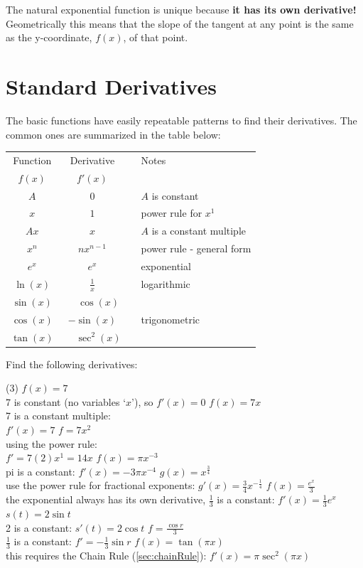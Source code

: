 The natural exponential function is unique because \textbf{it has its own derivative!} Geometrically this means that the slope of the tangent at any point is the same as the y-coordinate, $f(x)$, of that point. 

\section{Standard Derivatives}
The basic functions have easily repeatable patterns to find their derivatives. The common ones are summarized in the table below:
\begin{center}
	\begin{tabular}{ccll}	
		\toprule
		Function& Derivative&&Notes\\
		$f(x)$ & $f'(x)$  &&\\ \midrule
		$A$&0&&$A$ is constant\\ \midrule
		$x$&$1$&&power rule for $x^1$\\ \midrule
		$Ax$&$x$&&$A$ is a constant multiple\\ \midrule
		$x^n$ & $nx^{n-1}$ &&power rule - general form\\ \midrule
		$e^x$ & $e^x$  && exponential\\ \midrule
		$\ln(x)$ & $\frac{1}{x}$ &&logarithmic\\ \midrule
		$\sin(x)$ & $\phantom{-}\cos(x)$  && \\ \cmidrule{1-2}
		$\cos(x)$ & $-\sin(x)$ && trigonometric\\ \cmidrule{1-2}
		$\tan(x)$ & $\phantom{-}\sec^2(x)$ && \\ \bottomrule
	\end{tabular}
\end{center}\clearpage
\example Find the following derivatives:
\begin{tasks}[column-sep=2em,after-item-skip=3ex](3)
	\task $f(x)=7$\\ 7 is constant (no variables `$x$'), so $f'(x)=0$
	\task $f(x)=7x$\\ 7 is a constant multiple: \\ $f'(x)=7$
	\task $f=7x^2$\\ using the power rule:\\ $f'=7(2)x^1=14x$ 
	\task $f(x)=\pi x^{-3}$\\pi is a constant: $f'(x)=-3\pi x^{-4}$
	\task $\displaystyle g(x)=x^{\frac{3}{4}}$\\ use the power rule for fractional exponents: $\displaystyle g'(x)=\frac{3}{4}x^{-\frac{1}{4}}$
	\task $f(x)=\displaystyle\frac{e^x}{3}$\\ the exponential always has its own derivative, $\frac{1}{3}$ is a constant: $f'(x)=\frac{1}{3}e^x$ 	
	\task $s(t)=2\sin t$\\ 2 is a constant: $s'(t)=2\cos t$
	\task $f=\displaystyle\frac{\cos r}{3}$\\ $\frac{1}{3}$ is a constant: $f'=-\frac{1}{3}\sin r$
	\task $f(x)=\tan (\pi x)$\\ this requires the Chain Rule (\ref{sec:chainRule}): $f'(x)=\pi\sec^2 (\pi x)$
\end{tasks}

